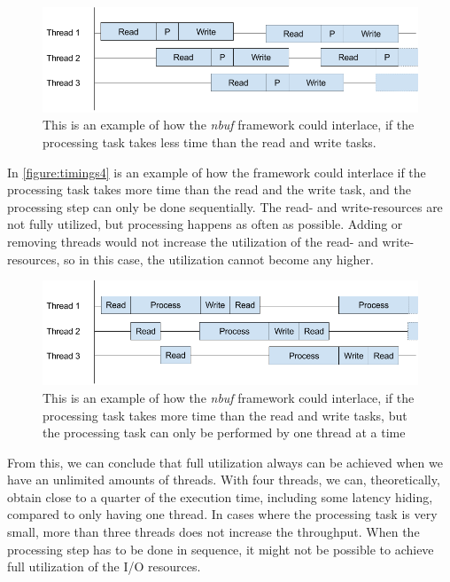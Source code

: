 \documentclass[a4paper]{article}
\newcommand{\nbuf}{\textit{nbuf} }
\begin{document}
\begin{figure}
	\begin{adjustwidth}{-0.5in}{-0.5in}
    \centering
     \includegraphics[scale=0.5]{figures/timings3.png}
  	\caption{This is an example of how the \nbuf framework could interlace, if the processing task takes less time than the read and write tasks.}
	\label{figure:timings3}
	\end{adjustwidth}
\end{figure}

In \autoref{figure:timings4} is an example of how the framework could interlace if the processing task takes more time than the read and the write task, and the processing step can only be done sequentially. The read- and write-resources are not fully utilized, but processing happens as often as possible. Adding or removing threads would not increase the utilization of the read- and write-resources, so in this case, the utilization cannot become any higher.\\

\begin{figure}
	\begin{adjustwidth}{-0.5in}{-0.5in}
    \centering
     \includegraphics[scale=0.5]{figures/timings4.png}
  	\caption{This is an example of how the \nbuf framework could interlace, if the processing task takes more time than the read and write tasks, but the processing task can only be performed by one thread at a time}
	\label{figure:timings4}
	\end{adjustwidth}
\end{figure}


From this, we can conclude that full utilization always can be achieved when we have an unlimited amounts of threads. With four threads, we can, theoretically, obtain close to a quarter of the execution time, including some latency hiding, compared to only having one thread. In cases where the processing task is very small, more than three threads does not increase the throughput. When the processing step has to be done in sequence, it might not be possible to achieve full utilization of the I/O resources.
\end{document}
